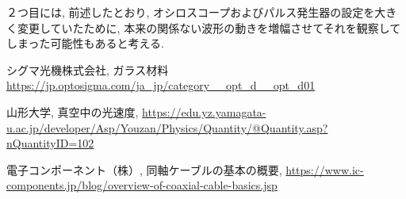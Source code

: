 \documentclass{jarticle}
\begin{document}
２つ目には, 前述したとおり, オシロスコープおよびパルス発生器の設定を大きく変更していたために, 本来の関係ない波形の動きを増幅させてそれを観察してしまった可能性もあると考える.



\begin{thebibliography}{99}

  シグマ光機株式会社, ガラス材料 \url{https://jp.optosigma.com/ja_jp/category__opt_d__opt_d01}

  山形大学, 真空中の光速度, \url{https://edu.yz.yamagata-u.ac.jp/developer/Asp/Youzan/Physics/Quantity/@Quantity.asp?nQuantityID=102}

  電子コンポーネント（株）, 同軸ケーブルの基本の概要, \url{https://www.ic-components.jp/blog/overview-of-coaxial-cable-basics.jsp}

\end{thebibliography}
\end{document}
